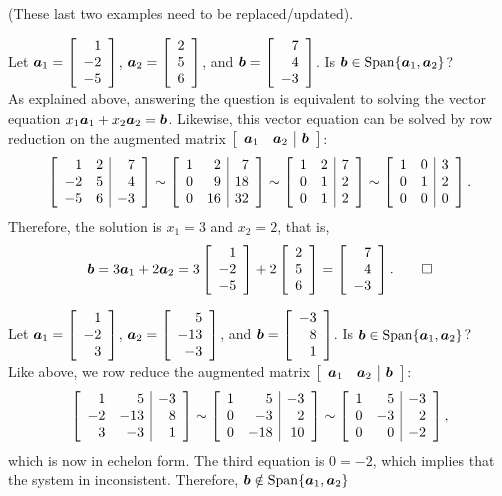 {\color{red} (These last two examples need to be replaced/updated).}
\begin{Exam} Let $\bb a_1 = \vr{1 \\ -2 \\ -5}$, $\bb a_2 = \vr{2 \\ 5 \\ 6}$, and $\bb b = \vr{7 \\ 4 \\ -3}$. Is $\bb b \in \Span\{\bb a_1, \bb a_2\}$?\\
As explained above, answering the question is equivalent to solving the vector equation $x_1\bb a_1 + x_2\bb a_2 = \bb b$. Likewise, this vector equation can be solved by row reduction on the augmented matrix $\mtx{rr|r}{ \bb a_1 & \bb a_2 & \bb b}$:
\[\mtx{rr|r}{1 & 2 & 7 \\ -2 & 5 & 4 \\ -5 & 6 & -3} \sim \mtx{rr|r}{1 & 2 & 7 \\ 0 & 9 & 18 \\ 0 & 16 & 32} \sim \mtx{rr|r}{1 & 2 & 7 \\ 0 & 1 & 2 \\ 0 & 1 & 2}  \sim \mtx{rr|r}{1 & 0 & 3 \\ 0 & 1 & 2 \\ 0 & 0 & 0}.\] Therefore, the solution is $x_1 = 3$ and $x_2 = 2$, that is, 
\[\bb b  = 3\bb a_1 + 2 \bb a_2 = 3\vr{1 \\ -2 \\ -5} + 2\vr{2 \\ 5 \\ 6} = \vr{7 \\ 4 \\ -3}.\qedhere\]
\end{Exam}\vs

\begin{Exam} Let $\bb a_1 = \vr{1 \\ -2 \\ 3}$, $\bb a_2 = \vr{5 \\ -13 \\ -3}$, and $\bb b = \vr{-3 \\ 8 \\ 1}$. Is $\bb b \in \Span\{\bb a_1, \bb a_2\}$?\\

Like above, we row reduce the augmented matrix $\mtx{rr|r}{ \bb a_1 & \bb a_2 & \bb b}$:
\[\mtx{rr|r}{1 & 5 & -3 \\ -2 & -13 & 8 \\ 3 & -3 & 1} \sim \mtx{rr|r}{1 & 5 & -3 \\ 0 & -3 & 2 \\ 0 & -18 & 10} \sim \mtx{rr|r}{1 & 5 & -3 \\ 0 & -3 & 2 \\ 0 & 0 & -2},\] which is now in echelon form. The third equation is $0=-2$, which implies that the system in inconsistent. Therefore, $\bb b\notin \Span\{\bb a_1, \bb a_2\}$
\end{Exam}



